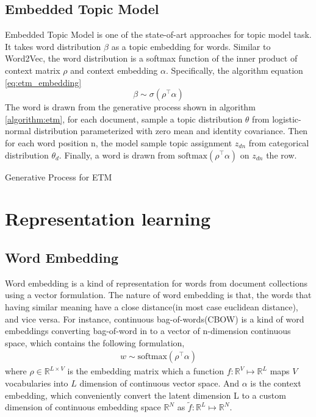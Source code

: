 \subsection{Embedded Topic Model} \label{ch2:etm}
Embedded Topic Model \cite{dieng_topic_2019} is one of the state-of-art approaches for topic model task. It takes word distribution $ \beta $ as a topic embedding for words. %
Similar to Word2Vec\cite{mikolov_distributed_2013}, the word distribution is a softmax function of the inner product of context matrix $ \rho $ and context embedding $ \alpha $. Specifically, the algorithm   equation \ref{eq:etm_embedding}
\begin{equation}\label{eq:etm_embedding}
\beta\sim\sigma(\rho^\top\alpha)
\end{equation}
The word is drawn from the generative process shown in algorithm \ref{algorithm:etm}, for each document, sample a topic distribution $ \theta $ from logistic-normal distribution parameterized with zero mean and identity covariance. Then for each word position n, the model sample topic assignment $ z_{dn} $ from categorical distribution $ \theta_d $. Finally, a word is drawn from $ \text{softmax}(\rho^\top\alpha) $ on $ z_{dn} $ the row.\\
\begin{algorithm}[H]\label{algorithm:etm}
\caption{Generative Process for ETM}
\end{algorithm}
\section{Representation learning}
\subsection{Word Embedding} \label{ch2:we}
Word embedding\cite{bengio_neural_2003} is a kind of representation for words from document collections using a vector formulation. The nature of word embedding is that, the words that having similar meaning have a close distance(in most case euclidean distance), and vice versa. For instance, continuous bag-of-words(CBOW) \cite{mikolov_distributed_2013} is a kind of word embeddings converting bag-of-word in to a vector of n-dimension continuous space, which contains the following formulation,
\begin{align*}
w\sim\text{softmax}(\rho^\top\alpha)
\end{align*}
where $ \rho\in\mathbb{R}^{L\times V} $ is the embedding matrix which a function $ f:\mathbb{R}^V\mapsto\mathbb{R}^{L} $ maps $ V $ vocabularies into $ L $ dimension of continuous vector space. And $ \alpha $ is the context embedding, which conveniently convert the latent dimension L to a custom dimension of continuous embedding space $ \mathbb{R}^{N} $ as $ \tilde{f}:\mathbb{R}^L\mapsto\mathbb{R}^{N} $.
